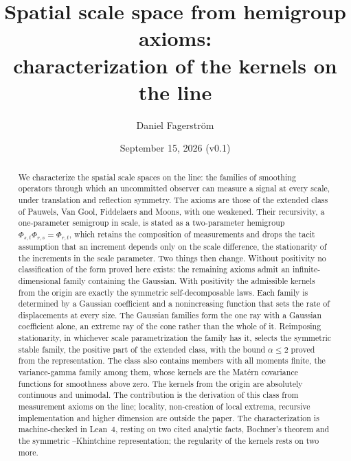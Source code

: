 \documentclass[11pt]{article}
\title{Spatial scale space from hemigroup axioms:\\
characterization of the kernels on the line}
\author{Daniel Fagerstr\"om}
\date{September 15, 2026 (v0.1)}
\numberwithin{equation}{section}
\theoremstyle{plain}
\theoremstyle{definition}
\theoremstyle{remark}
\begin{document}
\maketitle

\begin{abstract}
We characterize the spatial scale spaces on the line: the families of smoothing operators
through which an uncommitted observer can measure a signal at every scale, under
translation and reflection symmetry. The axioms are those of the extended class of Pauwels,
Van Gool, Fiddelaers and Moons, with one weakened. Their recursivity, a one-parameter
semigroup in scale, is stated as a two-parameter hemigroup
$\Phi_{s,t}\Phi_{r,s} = \Phi_{r,t}$, which retains the composition of measurements and drops
the tacit assumption that an increment depends only on the scale difference, the
stationarity of the increments in the scale parameter. Two things then change. Without positivity no
classification of the form proved here exists: the remaining axioms admit an
infinite-dimensional family containing the Gaussian. With positivity the admissible
kernels from the origin are exactly the symmetric self-decomposable laws. Each family is
determined by a Gaussian coefficient and a nonincreasing function that sets the rate of
displacements at every size. The Gaussian families form the one ray with a Gaussian
coefficient alone, an extreme ray of the cone rather than the whole of it. Reimposing
stationarity, in whichever scale parametrization the family has it, selects the
symmetric stable family, the positive part of the extended class, with the
bound $\alpha \le 2$ proved from the representation. The class also contains members with
all moments finite, the variance-gamma family among them, whose kernels are the Mat\'ern
covariance functions for smoothness above zero. The kernels from the origin are absolutely
continuous and unimodal. The contribution is the derivation of this class from measurement
axioms on the line; locality, non-creation of local extrema, recursive implementation and
higher dimension are outside the paper. The characterization is machine-checked in Lean~4,
resting on two cited analytic facts, Bochner's theorem and the symmetric \Levy--Khintchine
representation; the regularity of the kernels rests on two more.
\end{abstract}









\end{document}
